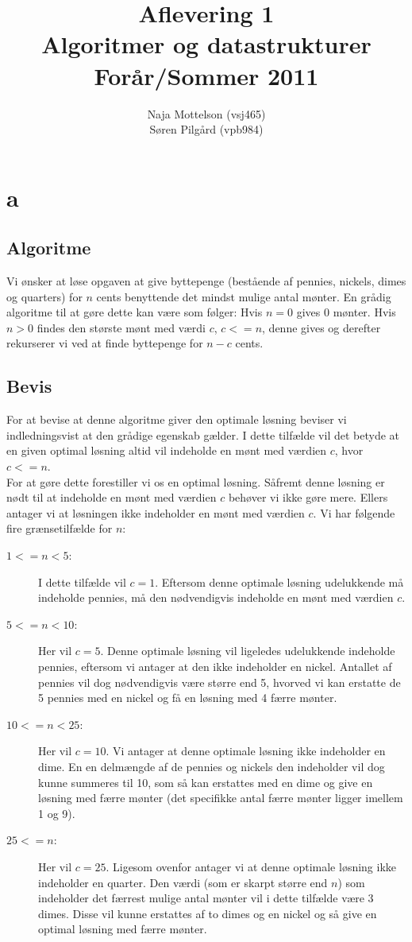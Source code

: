 \documentclass[10pt,a4paper,danish]{article}
\title{Aflevering 1 \\Algoritmer og datastrukturer\\Forår/Sommer 2011}
\author{Naja Mottelson (vsj465)\\Søren Pilgård (vpb984)}
\begin{document}
\maketitle
\newpage

\tableofcontents
\newpage

\section{a}
\subsection{Algoritme}
Vi ønsker at løse opgaven at give byttepenge (bestående af pennies, nickels, dimes og quarters)
for $n$ cents benyttende det mindst mulige antal mønter. En grådig algoritme til at gøre dette kan være
som følger: Hvis $n = 0$ gives 0 mønter. Hvis $n > 0$ findes den største
mønt med værdi $c$, $c<=n$, denne gives og derefter rekurserer vi ved at finde byttepenge for $n-c$ cents.

\subsection{Bevis}
For at bevise at denne algoritme giver den optimale løsning beviser vi indledningsvist at den 
grådige egenskab gælder. I dette tilfælde vil det betyde at en given optimal løsning altid vil
indeholde en mønt med værdien $c$, hvor $c<=n$.
\\
For at gøre dette forestiller vi os en optimal løsning. Såfremt denne løsning er nødt til at indeholde
en mønt med værdien $c$ behøver vi ikke gøre mere. Ellers antager vi at løsningen ikke indeholder en 
mønt med værdien $c$. Vi har følgende fire grænsetilfælde for $n$: 

\begin{description}
\item[$1 <= n < 5$:] I dette tilfælde vil $c = 1$. Eftersom denne optimale løsning udelukkende må indeholde
pennies, må den nødvendigvis indeholde en mønt med værdien $c$. 
\item[$5 <= n < 10$:] Her vil $c = 5$. Denne optimale løsning vil ligeledes udelukkende indeholde pennies, 
eftersom vi antager at den ikke indeholder en nickel. Antallet af pennies vil dog nødvendigvis være større 
end 5, hvorved vi kan erstatte de 5 pennies med en nickel og få en løsning med 4 færre mønter. 
\item[$10 <= n < 25$:] Her vil $c = 10$. Vi antager at denne optimale løsning ikke indeholder en dime. En 
en delmængde af de pennies og nickels den indeholder vil dog kunne summeres til 10, som så kan erstattes med
en dime og give en løsning med færre mønter (det specifikke antal færre mønter ligger imellem 1 og 9).
\item[$25 <= n$:] Her vil $c = 25$. Ligesom ovenfor antager vi at denne optimale løsning ikke indeholder
en quarter. Den værdi (som er skarpt større end $n$) som indeholder det færrest mulige antal mønter vil i 
dette tilfælde være 3 dimes. Disse vil kunne erstattes af to dimes og en nickel og så give en optimal løsning
med færre mønter. 
\end{description}
\end{document}
